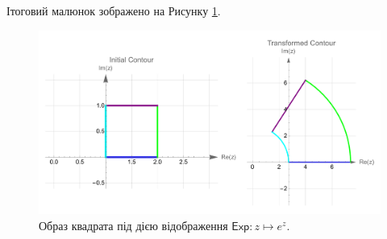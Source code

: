 \documentclass[14pt]{extarticle}
\newcommand{\<}{\langle}
\renewcommand{\>}{\rangle}
\theoremstyle{mystyle}{\newtheorem{definition}{Definition}[section]}
\theoremstyle{mystyle}{\newtheorem{proposition}[definition]{Proposition}}
\theoremstyle{mystyle}{\newtheorem{theorem}[definition]{Theorem}}
\theoremstyle{mystyle}{\newtheorem{lemma}[definition]{Lemma}}
\theoremstyle{mystyle}{\newtheorem{corollary}[definition]{Corollary}}
\theoremstyle{mystyle}{\newtheorem*{remark}{Remark}}
\theoremstyle{mystyle}{\newtheorem*{remarks}{Remarks}}
\theoremstyle{mystyle}{\newtheorem*{example}{Example}}
\theoremstyle{mystyle}{\newtheorem*{examples}{Examples}}
\theoremstyle{definition}{\newtheorem*{exercise}{Exercise}}
\theoremstyle{cstyle}{\newtheorem*{cthm}{}}
\theoremstyle{warn}
\begin{document}
Ітоговий малюнок зображено на Рисунку \ref{fig:problem-4}. 

\begin{figure}[H]
    \centering
    \includegraphics[width=\textwidth]{images/exam/transformation.pdf}
    \caption{Образ квадрата під дією відображення $\mathsf{Exp}: z \mapsto e^z$.}
    \label{fig:problem-4}
\end{figure}
\end{document}
